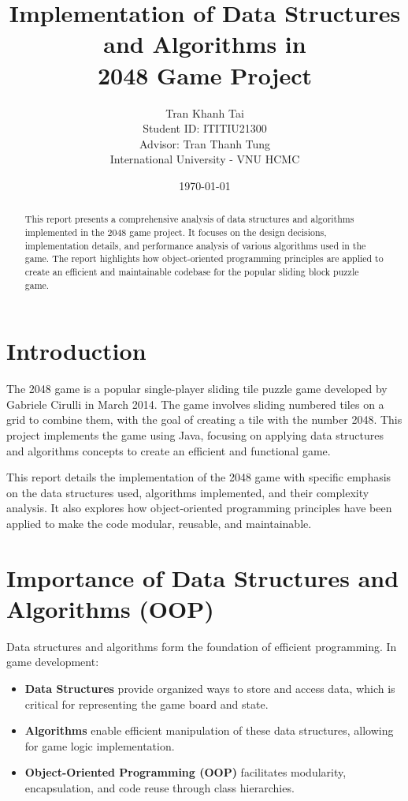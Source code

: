 \documentclass[12pt, a4paper]{article}
\title{\textbf{Implementation of Data Structures and Algorithms in\\2048 Game Project}}
\author{Tran Khanh Tai\\
Student ID: ITITIU21300\\
Advisor: Tran Thanh Tung\\
International University - VNU HCMC}
\date{\today}
\begin{document}
\maketitle

\begin{abstract}
This report presents a comprehensive analysis of data structures and algorithms implemented in the 2048 game project. It focuses on the design decisions, implementation details, and performance analysis of various algorithms used in the game. The report highlights how object-oriented programming principles are applied to create an efficient and maintainable codebase for the popular sliding block puzzle game.
\end{abstract}

\tableofcontents
\newpage

\section{Introduction}
The 2048 game is a popular single-player sliding tile puzzle game developed by Gabriele Cirulli in March 2014. The game involves sliding numbered tiles on a grid to combine them, with the goal of creating a tile with the number 2048. This project implements the game using Java, focusing on applying data structures and algorithms concepts to create an efficient and functional game.

This report details the implementation of the 2048 game with specific emphasis on the data structures used, algorithms implemented, and their complexity analysis. It also explores how object-oriented programming principles have been applied to make the code modular, reusable, and maintainable.

\section{Importance of Data Structures and Algorithms (OOP)}
Data structures and algorithms form the foundation of efficient programming. In game development:

\begin{itemize}
    \item \textbf{Data Structures} provide organized ways to store and access data, which is critical for representing the game board and state.
    \item \textbf{Algorithms} enable efficient manipulation of these data structures, allowing for game logic implementation.
    \item \textbf{Object-Oriented Programming (OOP)} facilitates modularity, encapsulation, and code reuse through class hierarchies.
\end{itemize}
\end{document}
